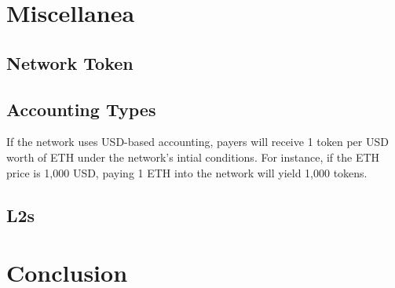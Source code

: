 \documentclass{article}
\begin{document}
\section{Miscellanea}

\subsection{Network Token}

\subsection{Accounting Types}\label{sec:accounting_types}

If the network uses USD-based accounting, payers will receive 1 token per USD worth of ETH under the network's intial conditions. For instance, if the ETH price is 1,000 USD, paying 1 ETH into the network will yield 1,000 tokens.

\subsection{L2s}

\section{Conclusion}

% 
% 
\end{document}
